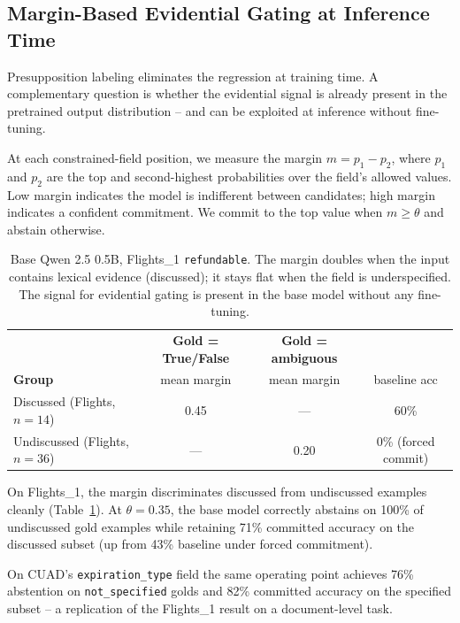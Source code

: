 \documentclass[11pt]{article}
\begin{document}
\subsection{Margin-Based Evidential Gating at Inference Time}\label{sec:gating}

Presupposition labeling eliminates the regression at training time. A complementary question is whether the evidential signal is already present in the pretrained output distribution -- and can be exploited at inference without fine-tuning.

At each constrained-field position, we measure the margin $m = p_1 - p_2$, where $p_1$ and $p_2$ are the top and second-highest probabilities over the field's allowed values. Low margin indicates the model is indifferent between candidates; high margin indicates a confident commitment. We commit to the top value when $m \ge \theta$ and abstain otherwise.

\begin{table}[h]
\centering
\small
\begin{tabular}{lccc}
\toprule
 & \textbf{Gold = True/False} & \textbf{Gold = ambiguous} & \\
\textbf{Group} & mean margin & mean margin & baseline acc \\
\midrule
Discussed (Flights, $n=14$) & 0.45 & --- & 60\% \\
Undiscussed (Flights, $n=36$) & --- & 0.20 & 0\% (forced commit) \\
\bottomrule
\end{tabular}
\caption{Base Qwen 2.5 0.5B, Flights\_1 \texttt{refundable}. The margin doubles when the input contains lexical evidence (discussed); it stays flat when the field is underspecified. The signal for evidential gating is present in the base model without any fine-tuning.}
\label{tab:gating_flights}
\end{table}

On Flights\_1, the margin discriminates discussed from undiscussed examples cleanly (Table~\ref{tab:gating_flights}). At $\theta = 0.35$, the base model correctly abstains on 100\% of undiscussed gold examples while retaining 71\% committed accuracy on the discussed subset (up from 43\% baseline under forced commitment).

On CUAD's \texttt{expiration\_type} field the same operating point achieves 76\% abstention on \texttt{not\_specified} golds and 82\% committed accuracy on the specified subset -- a replication of the Flights\_1 result on a document-level task.
\end{document}
